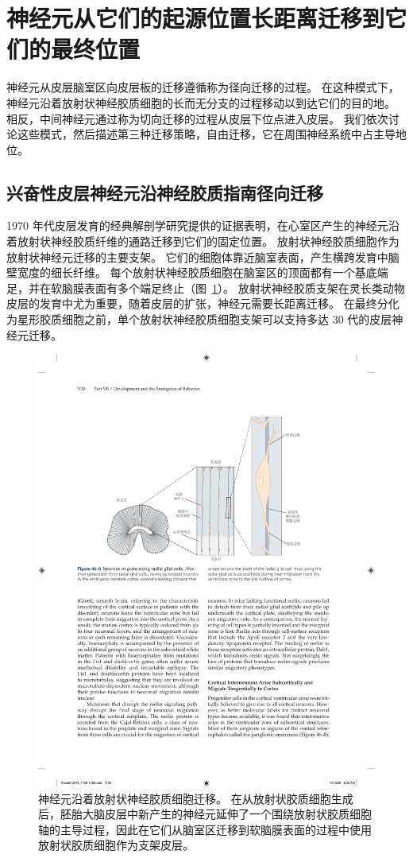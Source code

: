 \section{神经元从它们的起源位置长距离迁移到它们的最终位置}

神经元从皮层脑室区向皮层板的迁移遵循称为径向迁移的过程。
在这种模式下，神经元沿着放射状神经胶质细胞的长而无分支的过程移动以到达它们的目的地。
相反，中间神经元通过称为切向迁移的过程从皮层下位点进入皮层。
我们依次讨论这些模式，然后描述第三种迁移策略，自由迁移，它在周围神经系统中占主导地位。



\subsection{兴奋性皮层神经元沿神经胶质指南径向迁移}

1970 年代皮层发育的经典解剖学研究提供的证据表明，在心室区产生的神经元沿着放射状神经胶质纤维的通路迁移到它们的固定位置。
放射状神经胶质细胞作为放射状神经元迁移的主要支架。
它们的细胞体靠近脑室表面，产生横跨发育中脑壁宽度的细长纤维。
每个放射状神经胶质细胞在脑室区的顶面都有一个基底端足，并在软脑膜表面有多个端足终止（图~\ref{fig:46_6}）。
放射状神经胶质支架在灵长类动物皮层的发育中尤为重要，随着皮层的扩张，神经元需要长距离迁移。
在最终分化为星形胶质细胞之前，单个放射状神经胶质细胞支架可以支持多达 30 代的皮层神经元迁移。


\begin{figure}[htbp]
	\centering
	\includegraphics[width=0.8\linewidth]{chap46/fig_46_6}
	\caption{神经元沿着放射状神经胶质细胞迁移。
		在从放射状胶质细胞生成后，胚胎大脑皮层中新产生的神经元延伸了一个围绕放射状胶质细胞轴的主导过程，因此在它们从脑室区迁移到软脑膜表面的过程中使用放射状胶质细胞作为支架皮层。}
	\label{fig:46_6}
\end{figure}


